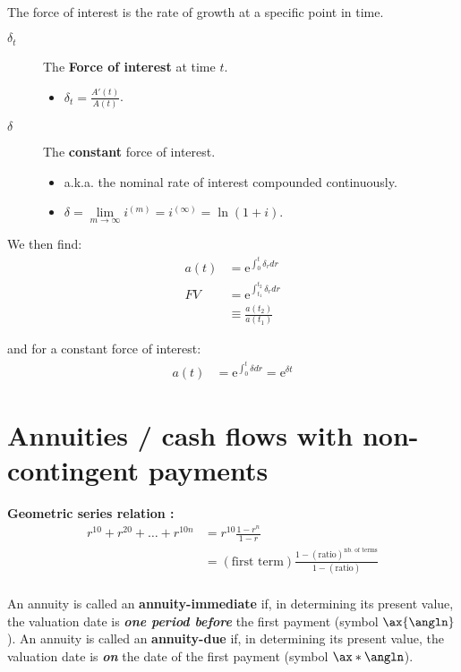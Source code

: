 \documentclass[10pt, french]{article}
\def\SectionColor{cobalt}
\begin{document}
\begin{multicols*}{2}
\

The force of interest is the rate of growth at a specific point in time.
\begin{distributions}
\begin{description}
	\item[$\delta_{t}$]	The \textbf{Force of interest} at time $t$.
		\begin{itemize}[leftmargin = *]
		\item	$\delta_{t} = \frac{A'(t)}{A(t)}$.
		\end{itemize}
	\item[$\delta$]	The \textbf{constant} force of interest.
		\begin{itemize}[leftmargin = *]
		\item	a.k.a. the nominal rate of interest compounded continuously.
		\item	$\delta = \underset{m \rightarrow \infty}{\lim} i^{(m)} = i^{(\infty)} = \ln(1 + i)$.
		\end{itemize}
\end{description}
\end{distributions}

We then find:
\begin{align*}
	a(t)
	&=	\textrm{e}^{\int_{0}^{t}\delta_{r}dr}	\\
	FV
	&=	\textrm{e}^{\int_{t_{1}}^{t_{2}}\delta_{r} dr}	\\
	&\equiv	\frac{a(t_{2})}{a(t_{1})}	
\end{align*}

and for a constant force of interest: 
\begin{align*}
	a(t)	
	&=	\textrm{e}^{\int_{0}^{t}\delta dr}	
	=	\textrm{e}^{\delta t}
\end{align*}


\newpage
\def\SectionColor{blue!80!white}
\section{Annuities / cash flows with non-contingent payments}
\textbf{Geometric series relation :}
\begin{align*}
	r^{10} + r^{20} + \dots + r^{10n}
	&=	r^{10}\frac{1 - r^{n}}{1 - r}	\\
	&=	(\text{first term}) \frac{1 - (\text{ratio})^{\text{nb. of terms}}}{1 - (\text{ratio})} 	\\
\end{align*}

\begin{definitionNOHFILL}[Annuity]
An annuity is called an \textbf{annuity-immediate} if, in determining its present value, the valuation date is \textbf{\textit{one period before}} the first payment (symbol $\ax{\angln}$). An annuity is called an \textbf{annuity-due} if, in determining its present value, the valuation date is \textit{\textbf{on}} the date of the first payment (symbol $\ax*{\angln}$).


\end{definitionNOHFILL}
\end{multicols*}
\end{document}
